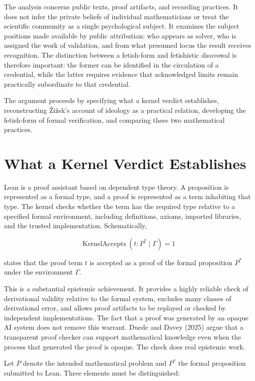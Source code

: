 \documentclass[pdflatex,sn-apa]{sn-jnl}
\begin{document}
The analysis concerns public texts, proof artifacts, and recording practices. It does not infer the private beliefs of individual mathematicians or treat the scientific community as a single psychological subject. It examines the subject positions made available by public attribution: who appears as solver, who is assigned the work of validation, and from what presumed locus the result receives recognition. The distinction between a fetish-form and fetishistic disavowal is therefore important: the former can be identified in the circulation of a credential, while the latter requires evidence that acknowledged limits remain practically subordinate to that credential.

The argument proceeds by specifying what a kernel verdict establishes, reconstructing Žižek's account of ideology as a practical relation, developing the fetish-form of formal verification, and comparing these two mathematical practices.
\section{What a Kernel Verdict Establishes}

Lean is a proof assistant based on dependent type theory. A proposition is represented as a formal type, and a proof is represented as a term inhabiting that type. The kernel checks whether the term has the required type relative to a specified formal environment, including definitions, axioms, imported libraries, and the trusted implementation. Schematically,

\[
\operatorname{KernelAccepts}(t:P^*\mid\Gamma)=1
\]

states that the proof term \(t\) is accepted as a proof of the formal proposition \(P^*\) under the environment \(\Gamma\).

This is a substantial epistemic achievement. It provides a highly reliable check of derivational validity relative to the formal system, excludes many classes of derivational error, and allows proof artifacts to be replayed or checked by independent implementations. The fact that a proof was generated by an opaque AI system does not remove this warrant. Duede and Davey (2025) argue that a transparent proof checker can support mathematical knowledge even when the process that generated the proof is opaque. The check does real epistemic work.

Let \(P\) denote the intended mathematical problem and \(P^*\) the formal proposition submitted to Lean. Three elements must be distinguished:
\end{document}
